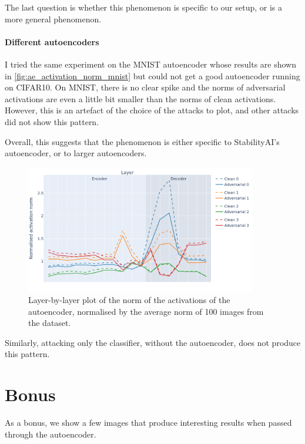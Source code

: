 \documentclass[]{scrarticle}
\begin{document}
The last question is whether this phenomenon is specific to
our setup, or is a more general phenomenon.

\paragraph{Different autoencoders}
I tried the same experiment on the MNIST autoencoder
whose results are shown in
\autoref{fig:ae_activation_norm_mnist}
but could not get a good autoencoder running on CIFAR10.
On MNIST, there is no clear spike and the norms of adversarial
activations are even a little bit smaller than the norms of clean activations.
However, this is an artefact of the choice of the attacks to plot,
and other attacks did not show this pattern.

Overall, this suggests that the phenomenon is either specific
to StabilityAI's autoencoder, or to larger autoencoders.

\begin{figure}[h]
  \centering
  \includegraphics[width=0.9\textwidth]{../images/ae_activation_norm_MNIST.png}
  \caption{
    Layer-by-layer plot of the norm of the activations of the autoencoder,
    normalised by the average norm of 100 images from the dataset.
  }
  \label{fig:ae_activation_norm_mnist}
\end{figure}


Similarly, attacking only the classifier, without the autoencoder,
does not produce this pattern.

\clearpage
\section*{Bonus}

As a bonus, we show a few images that produce interesting results when
passed through the autoencoder.
\end{document}
